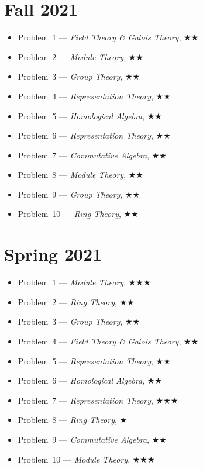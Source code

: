 \documentclass[11pt,letterpaper]{book}
\begin{document}
\section*{Fall 2021}
\begin{itemize}
\item Problem~1 --- \textit{Field Theory \& Galois Theory}, $\bigstar\bigstar$
\item Problem~2 --- \textit{Module Theory}, $\bigstar\bigstar$
\item Problem~3 --- \textit{Group Theory}, $\bigstar\bigstar$
\item Problem~4 --- \textit{Representation Theory}, $\bigstar\bigstar$
\item Problem~5 --- \textit{Homological Algebra}, $\bigstar\bigstar$
\item Problem~6 --- \textit{Representation Theory}, $\bigstar\bigstar$
\item Problem~7 --- \textit{Commutative Algebra}, $\bigstar\bigstar$
\item Problem~8 --- \textit{Module Theory}, $\bigstar\bigstar$
\item Problem~9 --- \textit{Group Theory}, $\bigstar\bigstar$
\item Problem~10 --- \textit{Ring Theory}, $\bigstar\bigstar$
\end{itemize}

\section*{Spring 2021}
\begin{itemize}
\item Problem~1 --- \textit{Module Theory}, $\bigstar\bigstar\bigstar$
\item Problem~2 --- \textit{Ring Theory}, $\bigstar\bigstar$
\item Problem~3 --- \textit{Group Theory}, $\bigstar\bigstar$
\item Problem~4 --- \textit{Field Theory \& Galois Theory}, $\bigstar\bigstar$
\item Problem~5 --- \textit{Representation Theory}, $\bigstar\bigstar$
\item Problem~6 --- \textit{Homological Algebra}, $\bigstar\bigstar$
\item Problem~7 --- \textit{Representation Theory}, $\bigstar\bigstar\bigstar$
\item Problem~8 --- \textit{Ring Theory}, $\bigstar$
\item Problem~9 --- \textit{Commutative Algebra}, $\bigstar\bigstar$
\item Problem~10 --- \textit{Module Theory}, $\bigstar\bigstar\bigstar$
\end{itemize}
\end{document}
